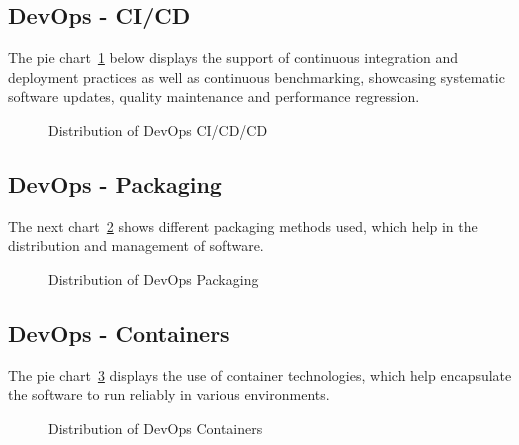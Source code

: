 \subsection{DevOps - CI/CD}

The pie chart~\ref{fig:devops-cicd} below displays the support of continuous integration and deployment practices as well as continuous benchmarking, showcasing systematic software updates, quality maintenance and performance regression.

\begin{figure}[H]
\centering
{}
\caption{Distribution of DevOps CI/CD/CD}
\label{fig:devops-cicd}
\end{figure}


\subsection{DevOps - Packaging}

The next chart~\ref{fig:devops-packaging} shows different packaging methods used, which help in the distribution and management of software.

\begin{figure}[H]
\centering
{}
\caption{Distribution of DevOps Packaging}
\label{fig:devops-packaging}
\end{figure}


\subsection{DevOps - Containers}

The pie chart~\ref{fig:devops-containers} displays the use of container technologies, which help encapsulate the software to run reliably in various environments.

\begin{figure}[H]
\centering
{}
\caption{Distribution of DevOps Containers}
\label{fig:devops-containers}
\end{figure}


